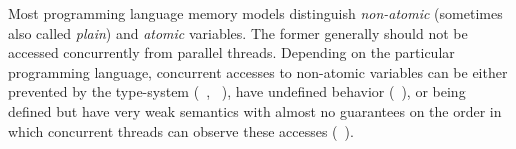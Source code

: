 
Most programming language memory models distinguish 
\emph{non-atomic} (sometimes also called \emph{plain})
and \emph{atomic} variables. 
The former generally should not be accessed 
concurrently from parallel threads. 
Depending on the particular programming language, 
concurrent accesses to non-atomic variables 
can be either prevented by the type-system 
(\eg \Haskell~\cite{Marlow-al:Haskell10, Vollmer-al:PPoPP17}, \Rust~\cite{RustBook:19}), 
have undefined behavior (\eg \CPP~\cite{Boehm-Adve:PLDI08, Batty-al:POPL11}), 
or being defined but have very weak semantics with almost 
no guarantees on the order in which concurrent
threads can observe these accesses (\eg \Java~\cite{Manson-al:POPL05}).

